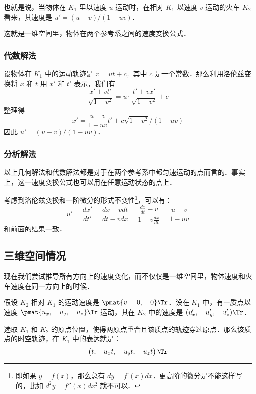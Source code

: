 也就是说，当物体在 $K_1$ 里以速度 $u$ 运动时，在相对 $K_1$ 以速度 $v$ 运动的火车 $K_2$ 看来，其速度是 $u'=(u-v)/(1-uv)$．

这就是一维空间里，物体在两个参考系之间的速度变换公式．

\subsubsection{代数解法}

设物体在 $K_1$ 中的运动轨迹是 $x=ut+c$，其中 $c$ 是一个常数．那么利用洛伦兹变换将 $x$ 和 $t$ 用 $x'$ 和 $t'$ 表示，我们有
\begin{equation}
\frac{x'+vt'}{\sqrt{1-v^2}}=u\cdot\frac{t'+vx'}{\sqrt{1-v^2}}+c
\end{equation}
整理得
\begin{equation}
x'=\frac{u-v}{1-uv}t'+c\sqrt{1-v^2}/(1-uv)
\end{equation}
因此 $u'=(u-v)/(1-uv)$．

\subsubsection{分析解法}

以上几何解法和代数解法都是对于在两个参考系中都匀速运动的点而言的．事实上，这一速度变换公式也可以用在任意运动状态的点上．

考虑到洛伦兹变换和一阶微分的形式不变性\footnote{即如果 $y=f(x)$，那么总有 $dy=f'(x)dx$．更高阶的微分是不能这样写的，比如 $d^2y=f''(x)dx^2$ 就不可以．}，可以有：
\begin{equation}
u'=\frac{dx'}{dt'}=\frac{dx-vdt}{dt-vdx}=\frac{\frac{dx}{dt}-v}{1-v\frac{dx}{dt}}=\frac{u-v}{1-uv}
\end{equation}
和前面的结果一致．

\subsection{三维空间情况}

现在我们尝试推导所有方向上的速度变化，而不仅仅是一维空间里，物体速度和火车速度在同一方向上的时候．

假设 $K_2$ 相对 $K_1$ 的运动速度是 $\pmat{v,\quad 0,\quad 0}\Tr$．设在 $K_1$ 中，有一质点以速度 $\pmat{u_x,\quad u_y,\quad u_z}\Tr$ 运动，其在 $K_2$ 中的速度是 $(u_x',\quad u_y',\quad u_z')\Tr$．

选取 $K_1$ 和 $K_2$ 的原点位置，使得两原点重合且该质点的轨迹穿过原点．那么该质点的时空轨迹，在 $K_1$ 中的表达就是：
\begin{equation}\label{RelVel_eq2}
\left(\begin{matrix}t,\quad u_xt,\quad u_yt,\quad u_zt\end{matrix} \right)\Tr 
\end{equation}

